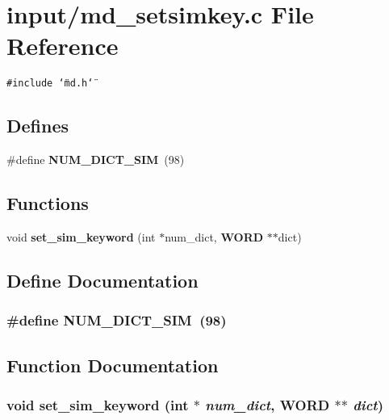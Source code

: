 \section{input/md\_\-setsimkey.c File Reference}
\label{input_2md__setsimkey_8c}
{\tt \#include \char`\"{}md.h\char`\"{}}\par
\subsection*{Defines}
\begin{CompactItemize}
\item 
\#define {\bf NUM\_\-DICT\_\-SIM}~(98)
\end{CompactItemize}
\subsection*{Functions}
\begin{CompactItemize}
\item 
void {\bf set\_\-sim\_\-keyword} (int $\ast$num\_\-dict, {\bf WORD} $\ast$$\ast$dict)
\end{CompactItemize}


\subsection{Define Documentation}
\subsubsection{\setlength{\rightskip}{0pt plus 5cm}\#define NUM\_\-DICT\_\-SIM~(98)}\label{input_2md__setsimkey_8c_96edd8cf3460e2300160ed516397a94a}




\subsection{Function Documentation}
\subsubsection{\setlength{\rightskip}{0pt plus 5cm}void set\_\-sim\_\-keyword (int $\ast$ {\em num\_\-dict}, {\bf WORD} $\ast$$\ast$ {\em dict})}\label{input_2md__setsimkey_8c_851f8402f98a05ab3129b643c2d84ca8}


